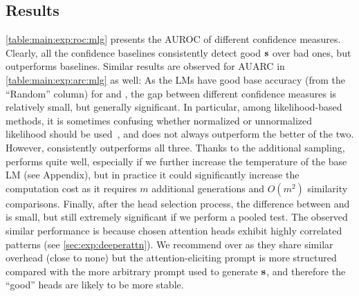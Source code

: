 


\subsection{Results}\label{sec:exp:result}
\cref{table:main:exp:roc:mlg} presents the AUROC of different confidence measures.
Clearly, all the confidence baselines consistently detect good $\mathbf{s}$ over bad ones, but \methodname outperforms baselines.
Similar results are observed for AUARC in \cref{table:main:exp:arc:mlg} as well: As the LMs have good base accuracy (from the ``Random'' column) for \datasetcoqa and \datasettrivia, the gap between different confidence measures is relatively small, but generally significant.
In particular, among likelihood-based methods, it is sometimes confusing whether normalized or unnormalized likelihood should be used~\citep{kuhn2023semantic,malinin2021uncertainty}, and 
\baselineSAR does not always outperform the better of the two.
However, \methodname consistently outperforms all three.
Thanks to the additional sampling, \baselineDegree performs quite well, especially if we further increase the temperature of the base LM (see Appendix), but in practice it could significantly increase the computation cost as it requires $m$ additional generations and $O(m^2)$ similarity comparisons.
Finally, after the head selection process, the difference between \methodnamePrompt and \methodnameNext is small, but still extremely significant if we perform a pooled test. %
The observed similar performance is because chosen attention heads exhibit highly correlated patterns (see \cref{sec:exp:deeperattn}).
We recommend \methodnamePrompt over \methodnameNext as they share similar overhead (close to none) but the attention-eliciting prompt is more structured compared with the more arbitrary prompt used to generate $\mathbf{s}$, and therefore the ``good'' heads are likely to be more stable.



